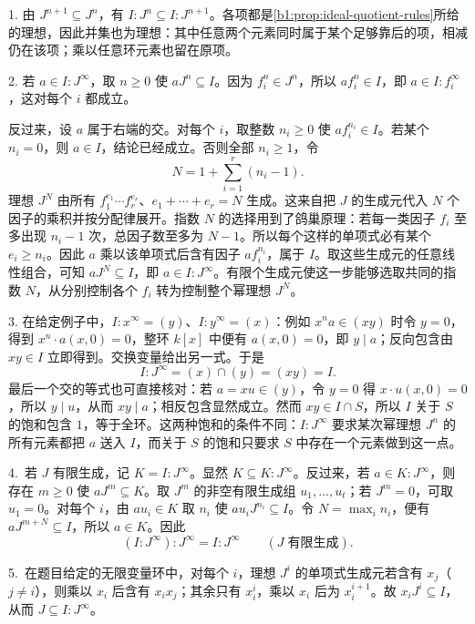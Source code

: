 \begin{solution}
	1. 由 \(J^{n+1}\subseteq J^n\)，有 \(I:J^n\subseteq I:J^{n+1}\)。各项都是\cref{b1:prop:ideal-quotient-rules}所给的理想，因此并集也为理想：其中任意两个元素同时属于某个足够靠后的项，相减仍在该项；乘以任意环元素也留在原项。

	2. 若 \(a\in I:J^\infty\)，取 \(n\geq0\) 使 \(aJ^n\subseteq I\)。因为 \(f_i^n\in J^n\)，所以 \(af_i^n\in I\)，即 \(a\in I:f_i^\infty\)，这对每个 \(i\) 都成立。

	反过来，设 \(a\) 属于右端的交。对每个 \(i\)，取整数 \(n_i\geq0\) 使 \(af_i^{n_i}\in I\)。若某个 \(n_i=0\)，则 \(a\in I\)，结论已经成立。否则全部 \(n_i\geq1\)，令
	\[
		N=1+\sum_{i=1}^{r}(n_i-1).
	\]
	理想 \(J^N\) 由所有 \(f_1^{e_1}\cdots f_r^{e_r}\)、\(e_1+\cdots+e_r=N\) 生成。这来自把 \(J\) 的生成元代入 \(N\) 个因子的乘积并按分配律展开。指数 \(N\) 的选择用到了鸽巢原理：若每一类因子 \(f_i\) 至多出现 \(n_i-1\) 次，总因子数至多为 \(N-1\)。所以每个这样的单项式必有某个 \(e_i\geq n_i\)。因此 \(a\) 乘以该单项式后含有因子 \(af_i^{n_i}\)，属于 \(I\)。取这些生成元的任意线性组合，可知 \(aJ^N\subseteq I\)，即 \(a\in I:J^\infty\)。有限个生成元使这一步能够选取共同的指数 \(N\)，从分别控制各个 \(f_i\) 转为控制整个幂理想 \(J^N\)。

	3. 在给定例子中，\(I:x^\infty=(y)\)、\(I:y^\infty=(x)\)：例如 \(x^na\in(xy)\) 时令 \(y=0\)，得到 \(x^n\cdot a(x,0)=0\)，整环 \(k[x]\) 中便有 \(a(x,0)=0\)，即 \(y\mid a\)；反向包含由 \(xy\in I\) 立即得到。交换变量给出另一式。于是
	\[
		I:J^\infty=(x)\cap(y)=(xy)=I.
	\]
	最后一个交的等式也可直接核对：若 \(a=xu\in(y)\)，令 \(y=0\) 得 \(x\cdot u(x,0)=0\)，所以 \(y\mid u\)，从而 \(xy\mid a\)；相反包含显然成立。然而 \(xy\in I\cap S\)，所以 \(I\) 关于 \(S\) 的饱和包含 \(1\)，等于全环。这两种饱和的条件不同：\(I:J^\infty\) 要求某次幂理想 \(J^n\) 的所有元素都把 \(a\) 送入 \(I\)，而关于 \(S\) 的饱和只要求 \(S\) 中存在一个元素做到这一点。

	4.\ 若 \(J\) 有限生成，记 \(K=I:J^\infty\)。显然 \(K\subseteq K:J^\infty\)。反过来，若 \(a\in K:J^\infty\)，则存在 \(m\geq0\) 使 \(aJ^m\subseteq K\)。取 \(J^m\) 的非空有限生成组 \(u_1,\ldots,u_t\)；若 \(J^m=0\)，可取 \(u_1=0\)。对每个 \(i\)，由 \(au_i\in K\) 取 \(n_i\) 使 \(au_iJ^{n_i}\subseteq I\)。令 \(N=\max_i n_i\)，便有 \(aJ^{m+N}\subseteq I\)，所以 \(a\in K\)。因此
	\[
		(I:J^\infty):J^\infty=I:J^\infty\qquad(J\;\text{有限生成}).
	\]

	5.\ 在题目给定的无限变量环中，对每个 \(i\)，理想 \(J^i\) 的单项式生成元若含有 \(x_j\)（\(j\ne i\)），则乘以 \(x_i\) 后含有 \(x_ix_j\)；其余只有 \(x_i^i\)，乘以 \(x_i\) 后为 \(x_i^{i+1}\)。故 \(x_iJ^i\subseteq I\)，从而 \(J\subseteq I:J^\infty\)。


\end{solution}
